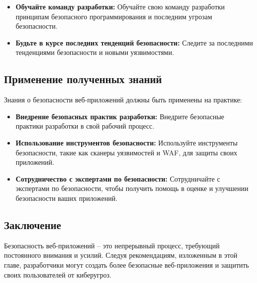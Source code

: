 \documentclass[a4paper,12pt]{diplom}
\begin{document}
	 \begin{itemize}
	 	\item \textbf{Обучайте команду разработки:} Обучайте свою команду разработки принципам безопасного программирования и последним угрозам безопасности.
	 	\item \textbf{Будьте в курсе последних тенденций безопасности:} Следите за последними тенденциями безопасности и новыми уязвимостями.
	 \end{itemize}
	 
	 \subsection{Применение полученных знаний}
	 
	 Знания о безопасности веб-приложений должны быть применены на практике:
	 
	 \begin{itemize}
	 	\item \textbf{Внедрение безопасных практик разработки:}  Внедрите безопасные практики разработки в свой рабочий процесс.
	 	\item \textbf{Использование инструментов безопасности:}  Используйте инструменты безопасности, такие как сканеры уязвимостей и WAF, для защиты своих приложений.
	 	\item \textbf{Сотрудничество с экспертами по безопасности:}  Сотрудничайте с экспертами по безопасности, чтобы получить помощь в оценке и улучшении безопасности ваших приложений.
	 \end{itemize}
	 
	 \subsection{Заключение}
	 
	 Безопасность веб-приложений – это непрерывный процесс, требующий постоянного внимания и усилий.  Следуя рекомендациям, изложенным в этой главе, разработчики могут создать более безопасные веб-приложения и защитить своих пользователей от киберугроз.
	 
	 
	 
	 
	 
	 
	 
	 
	 
	 
	 
	 
	
	
	
	
	
	
	
	
	
\end{document}

